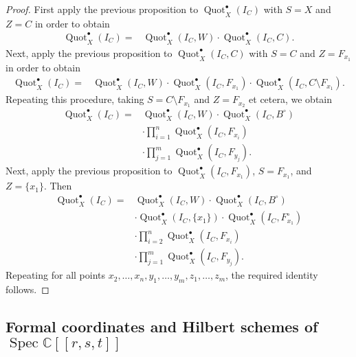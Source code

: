 \documentclass[12pt]{amsart}
\theoremstyle{definition}
\newcommand{\CC} {\mathbb{C}}          %
\newcommand{\Quot}{\operatorname{Quot}}
\newcommand{\Spec}{\operatorname{Spec}}
\newcommand{\SubSecSpace}{$\,$\vspace{0.2cm}\par } %
\begin{document}
\begin{proof}
First apply the previous proposition to $\Quot_X^{\bullet}(I_C)$ 
with $S = X$ and $Z = C$ in order to obtain
\begin{align*}
\Quot_X^{\bullet}(I_C)  =&\Quot_X^{\bullet}(I_C,W) \cdot 
\Quot_X^{\bullet}(I_C,C).
\end{align*}
Next, apply the previous proposition to $\Quot_X^{\bullet}(I_C,C)$ 
with $S = C$ and $Z = F_{x_1}$ in order to obtain
\begin{align*}
\Quot_X^{\bullet}(I_C)  =&\Quot_X^{\bullet}(I_C,W) \cdot 
\Quot_X^{\bullet}(I_C,F_{x_1}) \cdot \Quot_X^{\bullet}(I_C,C\setminus F_{x_1}).
\end{align*}
Repeating this procedure, taking $S = C \setminus F_{x_1}$ and 
$Z = F_{x_2}$ et cetera, we obtain
\begin{align*}
\Quot_X^{\bullet}(I_C) =&\Quot_X^{\bullet}(I_C,W) \cdot
\Quot_X^{\bullet}(I_C,B^\circ) \\
&\cdot \prod_{i=1}^{n}
\Quot_X^{\bullet}(I_C,F_{x_i}) \\
&\cdot \prod_{j=1}^{m}
\Quot_X^{\bullet}(I_C,F_{y_j}).
\end{align*}
Next, apply the previous proposition to $\Quot_X^{\bullet}(I_C,F_{x_1})$, 
$S = F_{x_1}$, and $Z = \{x_1\}$. Then
\begin{align*}
\Quot_X^{\bullet}(I_C) =&\Quot_X^{\bullet}(I_C,W) \cdot
\Quot_X^{\bullet}(I_C,B^\circ) \\
& \cdot \Quot_X^\bullet(I_C,\{x_1\}) \cdot \Quot_X^\bullet(I_C,F_{x_1}^\circ) \\
&\cdot \prod_{i=2}^{n}
\Quot_X^{\bullet}(I_C,F_{x_i}) \\
&\cdot \prod_{j=1}^{m}
\Quot_X^{\bullet}(I_C,F_{y_j}).
\end{align*}
Repeating for all points $x_2, \ldots, x_n, y_1, \ldots, y_m, z_1, \ldots, z_m$, 
the required identity follows.
\end{proof}


\subsection{Formal coordinates and Hilbert schemes
of $\Spec \CC [[r,s,t]]$}\label{subsec: Formal coordinates and
reduction to Hilbert scheme on C3}\SubSecSpace
\end{document}
